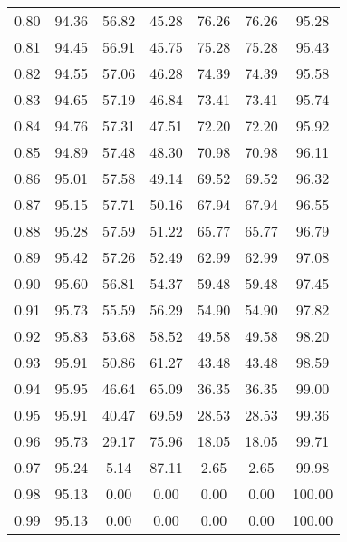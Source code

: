\begin{tabular}{|c|c|c|c|c|c|c|}
      0.80 &     94.36 &     56.82 &      45.28 &   76.26 &      76.26 &         95.28 \\
      0.81 &     94.45 &     56.91 &      45.75 &   75.28 &      75.28 &         95.43 \\
      0.82 &     94.55 &     57.06 &      46.28 &   74.39 &      74.39 &         95.58 \\
      0.83 &     94.65 &     57.19 &      46.84 &   73.41 &      73.41 &         95.74 \\
      0.84 &     94.76 &     57.31 &      47.51 &   72.20 &      72.20 &         95.92 \\
      0.85 &     94.89 &     57.48 &      48.30 &   70.98 &      70.98 &         96.11 \\
      0.86 &     95.01 &     57.58 &      49.14 &   69.52 &      69.52 &         96.32 \\
      0.87 &     95.15 &     57.71 &      50.16 &   67.94 &      67.94 &         96.55 \\
      0.88 &     95.28 &     57.59 &      51.22 &   65.77 &      65.77 &         96.79 \\
      0.89 &     95.42 &     57.26 &      52.49 &   62.99 &      62.99 &         97.08 \\
      0.90 &     95.60 &     56.81 &      54.37 &   59.48 &      59.48 &         97.45 \\
      0.91 &     95.73 &     55.59 &      56.29 &   54.90 &      54.90 &         97.82 \\
      0.92 &     95.83 &     53.68 &      58.52 &   49.58 &      49.58 &         98.20 \\
      0.93 &     95.91 &     50.86 &      61.27 &   43.48 &      43.48 &         98.59 \\
      0.94 &     95.95 &     46.64 &      65.09 &   36.35 &      36.35 &         99.00 \\
      0.95 &     95.91 &     40.47 &      69.59 &   28.53 &      28.53 &         99.36 \\
      0.96 &     95.73 &     29.17 &      75.96 &   18.05 &      18.05 &         99.71 \\
      0.97 &     95.24 &      5.14 &      87.11 &    2.65 &       2.65 &         99.98 \\
      0.98 &     95.13 &      0.00 &       0.00 &    0.00 &       0.00 &        100.00 \\
      0.99 &     95.13 &      0.00 &       0.00 &    0.00 &       0.00 &        100.00 \\
\bottomrule
\end{tabular}
